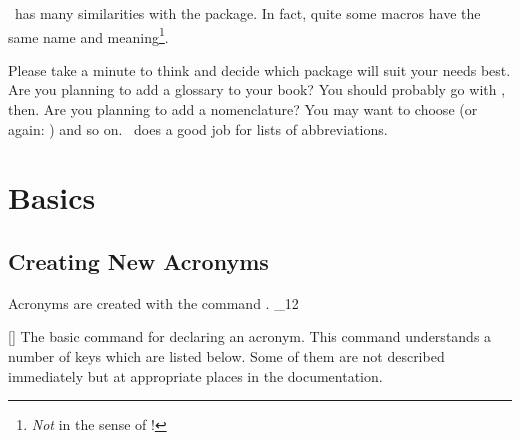 \documentclass[load-preamble+]{cnltx-doc}
\makeatletter
\renewenvironment{commands}
  {%
    \cnltx@set@catcode_{12}%
    \let\command\cnltx@command
    \cnltxlist
  }
  {\endcnltxlist}
\makeatother
\begin{document}
\acro\ has many similarities with the  package.  In fact, quite
some macros have the same name and meaning\footnote{\emph{Not} in the sense of
  !}.

Please take a minute to think and decide which package will suit your needs
best.  Are you planning to add a glossary to your book?  You should probably
go with , then.  Are you planning to add a nomenclature?  You
may want to choose  (or again: ) and so on.
\acro\ does a good job for lists of abbreviations.

\section{Basics}
\subsection{Creating New Acronyms}
Acronyms are created with the command .
\begin{commands}
  \command{DeclareAcronym}[]
    The basic command for declaring an acronym.
\end{commands}
This command understands a number of keys which are listed below.  Some of
them are not described immediately but at appropriate places in the
documentation.
\end{document}
